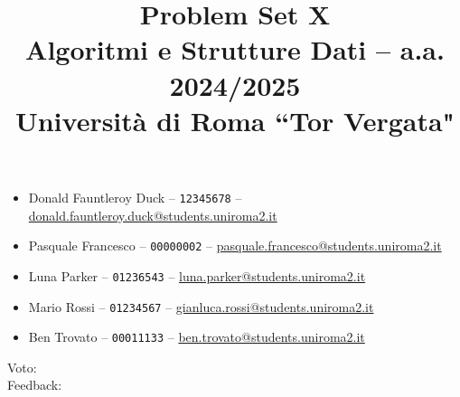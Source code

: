 \documentclass{article}
\title{Problem Set X\\
{\small Algoritmi e Strutture Dati -- a.a. 2024/2025}\\
{\small Università di Roma ``Tor Vergata"}
}
\date{}
\begin{document}
\maketitle

\begin{itemize}

    \item Donald Fauntleroy Duck -- \texttt{12345678} -- \href{mailto:donald.fauntleroy.duck@students.uniroma2.it}{donald.fauntleroy.duck@students.uniroma2.it}

    \item Pasquale Francesco -- \texttt{00000002} -- \href{mailto:pasquale.francesco@students.uniroma2.it}{pasquale.francesco@students.uniroma2.it}
    
    \item Luna Parker -- \texttt{01236543} -- \href{mailto:luna.parker@students.uniroma2.it}{luna.parker@students.uniroma2.it}
    
    \item Mario Rossi -- \texttt{01234567} -- \href{mailto:mario.rossi@students.uniroma2.it}{gianluca.rossi@students.uniroma2.it}
    
    \item Ben Trovato -- \texttt{00011133} -- \href{mailto:ben.trovato@students.uniroma2.it}{ben.trovato@students.uniroma2.it}

\end{itemize}

\bigskip
\begin{tcolorbox}[
    colback=white,           %
    colframe=black,          %
    coltitle=black,          %
    colbacktitle=gray!50,    %
    boxrule=1pt,             %
    title=\textbf{Valutazione complessiva}
    ]

\begin{description}
    \item[Voto:]
    \item[Feedback:]
\end{description}
\vspace{21\baselineskip}

\end{tcolorbox}

\newpage






\end{document}
